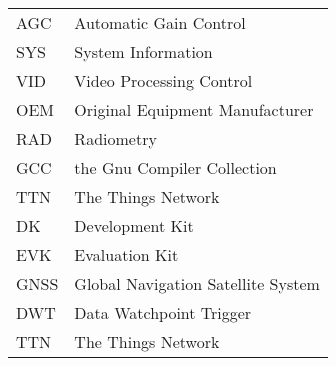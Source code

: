 \begin{flushleft}
\begin{longtable}[l]{p{2.5cm}l}
        AGC   & Automatic Gain Control\\
        SYS   & System Information\\
        VID   & Video Processing Control\\
        OEM   & Original Equipment Manufacturer\\
        RAD   & Radiometry\\
        GCC   & the Gnu Compiler Collection\\
        TTN   & The Things Network\\
        DK    & Development Kit\\
        EVK   & Evaluation Kit\\
        GNSS  & Global Navigation Satellite System\\
        DWT   & Data Watchpoint Trigger\\
        TTN   & The Things Network\\
\end{longtable}
\end{flushleft}
\endgroup

\newpage
